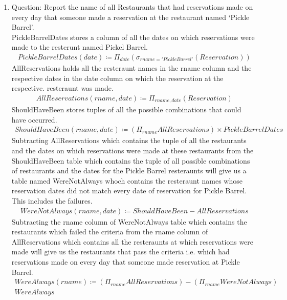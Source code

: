 \documentclass{article}
\begin{document}
\begin{enumerate}
\item %
	Question: Report the name of all Restaurants that had reservations made on every day that someone made a
reservation at the restaurant named ‘Pickle Barrel’.
\\
PickleBarrelDates stores a column of all the dates on which reservations were made to the resterunt named Pickel Barrel.
     	\begin{align}
        PickleBarrelDates(date)\coloneqq \Pi_{date} (\sigma_{rname='Pickle Barrel'} (Reservation))
        \end{align}
        AllReservations holds all the resteraunt names in the rname column and the respective dates in the date column on which the reservation at the respective. resteraunt was made.
        \begin{align}
        AllReservations(rname,date) \coloneqq \Pi_{rname, date} (Reservation)
        \end{align}
        ShouldHaveBeen stores tuples of all the possible combinations that could have occurred.
        \begin{align}
        ShouldHaveBeen(rname,date) \coloneqq (\Pi_{rname} AllReservations) \times PickleBarrelDates 
        \end{align}
        Subtracting AllReservations which contains the tuple of all the restaurants and the dates on which reservations were made at these restaurants from the ShouldHaveBeen table which contains the tuple of all possible combinations of restaurants and the dates for the Pickle Barrel resteraunts will give us a table named WereNotAlways whoch contains the resteraunt names whose reservation dates did not match every date of reservation for Pickle Barrel. This includes the failures.
        \begin{align}
        WereNotAlways(rname,date) \coloneqq ShouldHaveBeen-AllReservations 
        \end{align}
        Subtracting  the rname column of WereNotAlways table which contains the restaurants which failed the criteria from the rname column of AllReservations which contains all the resteraunts at which reservations were made will give us the restaurants that pass the criteria i.e. which had reservations made on every day that someone made reservation at Pickle Barrel.
        \begin{align}
        WereAlways(rname)  \coloneqq (\Pi_{rname} AllReservations)- (\Pi_{rname} WereNotAlways) \\
        WereAlways
		\end{align}
        
\end{enumerate}
\end{document}
